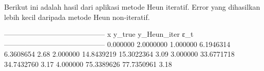 Berikut ini adalah hasil dari aplikasi metode Heun iteratif. Error yang dihasilkan lebih
kecil daripada metode Heun non-iteratif.
\begin{textcode}
------------------------------------------
  x         y_true      y_Heun_iter    ε_t
------------------------------------------
0.000000    2.0000000
1.000000    6.1946314    6.3608654   2.68%
2.000000   14.8439219   15.3022364   3.09%
3.000000   33.6771718   34.7432760   3.17%
4.000000   75.3389626   77.7350961   3.18%
\end{textcode}
